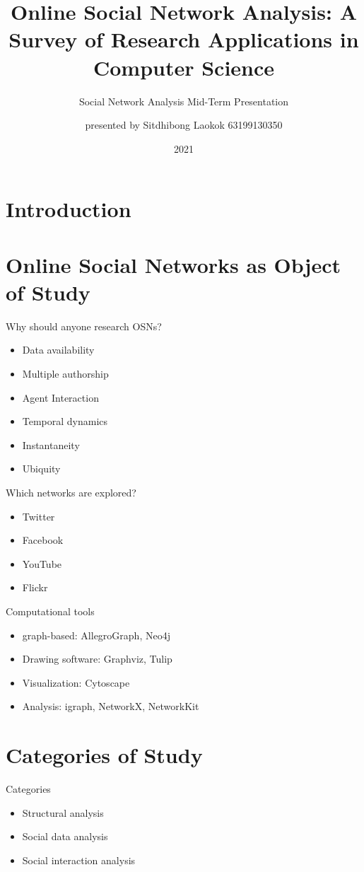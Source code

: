 \documentclass[8pt]{beamer}
\title{Online Social Network Analysis: A Survey of Research Applications in Computer Science}
\subtitle{Social Network Analysis Mid-Term Presentation}
\author{presented by {\newline}Sitdhibong Laokok {\newline}63199130350}
\date{2021}
\begin{document}
  \frame{\titlepage}

  \section{Introduction}

  \section{Online Social Networks as Object of Study}

  \begin{frame}{Why should anyone research OSNs?}
    \begin{itemize}[<+->]
      \item Data availability
      \item Multiple authorship
      \item Agent Interaction
      \item Temporal dynamics
      \item Instantaneity
      \item Ubiquity
    \end{itemize}
  \end{frame}

  \begin{frame}{Which networks are explored?}
    \begin{itemize}
      \item Twitter
      \item Facebook
      \item YouTube
      \item Flickr
    \end{itemize}
  \end{frame}

  \begin{frame}{Computational tools}
    \begin{itemize}
      \item graph-based: AllegroGraph, Neo4j
      \item Drawing software: Graphviz, Tulip
      \item Visualization: Cytoscape
      \item Analysis: igraph, NetworkX, NetworkKit
    \end{itemize}
    
  \end{frame}

  \section{Categories of Study}
  \begin{frame}{Categories}
    \begin{itemize}
      \item Structural analysis
      \item Social data analysis
      \item Social interaction analysis
    \end{itemize}
  \end{frame}
\end{document}
